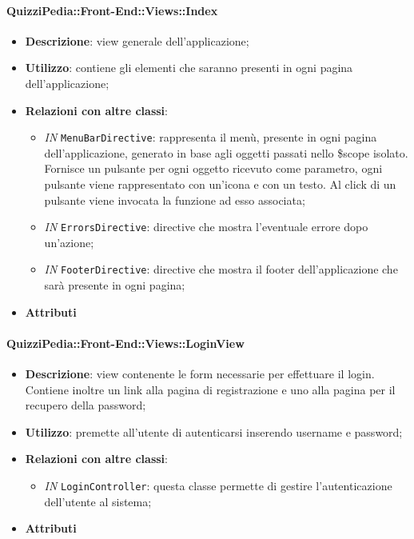 \paragraph{QuizziPedia::Front-End::Views::Index}
\begin{itemize}
	\item \textbf{Descrizione}:  view generale dell'applicazione;
	\item \textbf{Utilizzo}: contiene gli elementi che saranno presenti in ogni pagina dell'applicazione;
	\item \textbf{Relazioni con altre classi}:
	\begin{itemize}
		\item \textit{IN} \texttt{MenuBarDirective}: rappresenta il menù, presente in ogni pagina dell'applicazione, generato in base agli oggetti passati nello \$scope isolato. Fornisce un pulsante per ogni oggetto ricevuto come parametro, ogni pulsante viene rappresentato con un’icona e con un testo. Al click di un pulsante viene invocata la funzione ad esso associata;
		\item \textit{IN} \texttt{ErrorsDirective}: directive che mostra l'eventuale errore dopo un'azione;
		\item \textit{IN} \texttt{FooterDirective}: directive che mostra il footer dell'applicazione che sarà presente in ogni pagina;
	\end{itemize}
	\item \textbf{Attributi}
\end{itemize}

\paragraph{QuizziPedia::Front-End::Views::LoginView}
\begin{itemize}
	\item \textbf{Descrizione}: view contenente le form necessarie per effettuare il login. Contiene inoltre un link alla pagina di registrazione e uno alla pagina per il recupero della password;
	\item \textbf{Utilizzo}: premette all'utente di autenticarsi inserendo username e password;
	\item \textbf{Relazioni con altre classi}:
	\begin{itemize}
		\item \textit{IN} \texttt{LoginController}: questa classe permette di gestire l'autenticazione dell'utente al sistema;
	\end{itemize}
	\item \textbf{Attributi}
\end{itemize}

